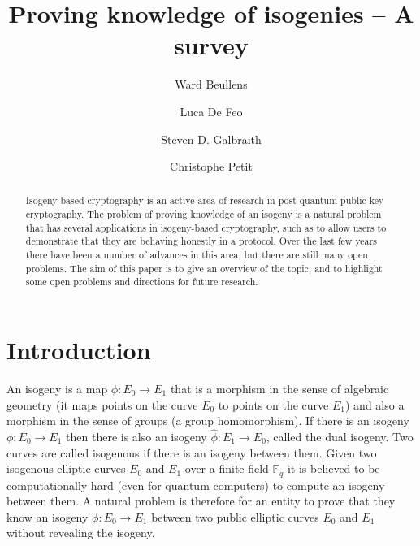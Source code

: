 \documentclass{llncs}
\newcommand{\F}{\ensuremath{\mathbb{F}}}
\begin{document}
\pagestyle{plain}

\title{Proving knowledge of isogenies -- A survey}


\author{Ward Beullens \and Luca De Feo \and Steven D. Galbraith \and Christophe Petit}


\maketitle


\begin{abstract}
Isogeny-based cryptography is an active area of research in post-quantum public key cryptography.
The problem of proving knowledge of an isogeny is a natural problem that has several applications in isogeny-based cryptography, such as to allow users to demonstrate that they are behaving honestly in a protocol.
Over the last few years there have been a number of advances in this area, but there are still many open problems.
The aim of this paper is to give an overview of the topic, and to highlight some open problems and directions for future research.
\end{abstract}



\section{Introduction}\label{sec1}



An isogeny is a map $\phi : E_0 \to E_1$ that is a morphism in the sense of algebraic geometry (it maps points on the curve $E_0$ to points on the curve $E_1$) and also a morphism in the sense of groups (a group homomorphism).
If there is an isogeny $\phi : E_0 \to E_1$ then there is also an isogeny $\hat{\phi} : E_1 \to E_0$, called the dual isogeny.
Two curves are called isogenous if there is an isogeny between them.
Given two isogenous elliptic curves $E_0$ and $E_1$ over a finite field $\F_q$ it is believed to be computationally hard (even for quantum computers) to compute an isogeny between them.
A natural problem is therefore for an entity to prove that they know an isogeny $\phi : E_0 \to E_1$ between two public elliptic curves $E_0$ and $E_1$ without revealing the isogeny.
\end{document}
